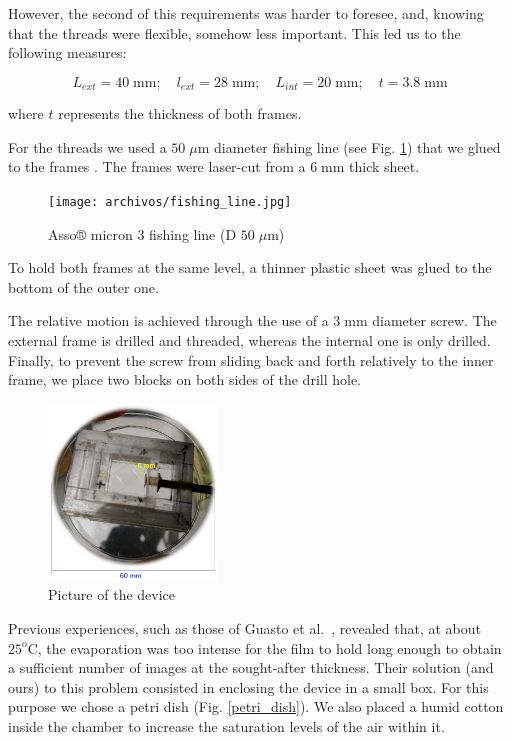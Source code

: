 However, the second of this requirements was harder to foresee, and, knowing that the threads were flexible, somehow less important. This led us to the following measures:

\begin{equation}
	L_{ext} = 40 \; \textrm{mm}; \quad l_{ext} = 28 \; \textrm{mm}; \quad L_{int} = 20 \; \textrm{mm}; \quad t = 3.8 \; \textrm{mm}
\end{equation}

where $t$ represents the thickness of both frames.

For the threads we used a $50 \; \mu \textrm{m}$ diameter fishing line (see Fig. \ref{fishing_line}) that we glued to the frames . The frames were laser-cut from a $6 \; \textrm{mm}$ thick sheet.

\begin{figure}[H]
	\centering
	\texttt{[image: archivos/fishing\_line.jpg]}
	\caption{Asso® micron 3 fishing line (D $50 \; \mu \textrm{m}$)}
	\label{fishing_line}
\end{figure}

To hold both frames at the same level, a thinner plastic sheet was glued to the bottom of the outer one.

The relative motion is achieved through the use of a $3 \; \textrm{mm}$ diameter screw. The external frame is drilled and threaded, whereas the internal one is only drilled. Finally, to prevent the screw from sliding back and forth relatively to the inner frame, we place two blocks on both sides of the drill hole.   

\begin{figure}[H]
	\centering
	\includegraphics[width=0.4\textwidth]{archivos/device.png}
	\caption{Picture of the device}
	\label{device}
\end{figure}

Previous experiences, such as those of Guasto et al.~\cite{Guasto}, revealed that, at about $25^\textrm{o}\textrm{C}$, the evaporation was too intense for the film to hold long enough to obtain a sufficient number of images at the sought-after thickness. Their solution (and ours) to this problem consisted in enclosing the device in a small box. For this purpose we chose a petri dish (Fig. \ref{petri_dish}). We also placed a humid cotton inside the chamber to increase the saturation levels of the air within it.

